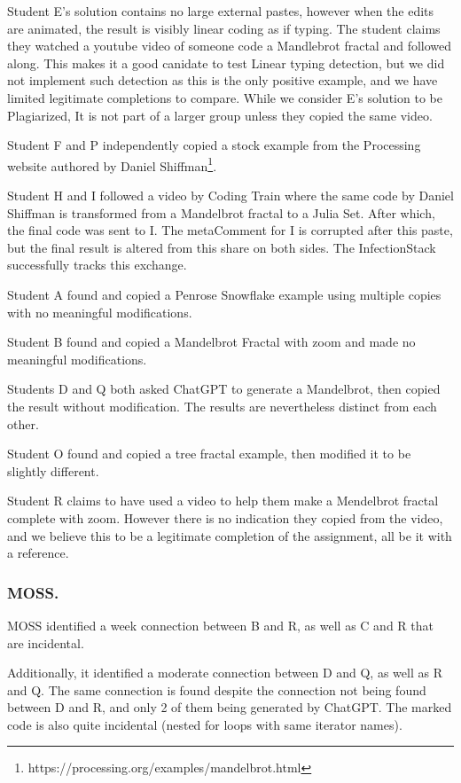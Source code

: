 \documentclass[10pt]{article}
\newcommand{\metaComment}{metaComment\xspace}
\newcommand{\infectionStack}{InfectionStack\xspace}
\begin{document}
Student E's solution contains no large external pastes, however when the edits are animated, the result is visibly linear coding as if typing.  The student claims they watched a youtube video of someone code a Mandlebrot fractal and followed along.  This makes it a good canidate to test Linear typing detection, but we did not implement such detection as this is the only positive example, and we have limited legitimate completions to compare.  While we consider E's solution to be Plagiarized, It is not part of a larger group unless they copied the same video.

Student F and P independently copied a stock example from the Processing website authored by Daniel Shiffman\footnote{https://processing.org/examples/mandelbrot.html}. 

Student H and I followed a video by Coding Train where the same code by Daniel Shiffman is transformed from a Mandelbrot fractal to a Julia Set.  After which, the final code was sent to I.  The \metaComment for I is corrupted after this paste, but the final result is altered from this share on both sides.  The \infectionStack successfully tracks this exchange.

Student A found and copied a Penrose Snowflake example using multiple copies with no meaningful modifications.

Student B found and copied a Mandelbrot Fractal with zoom and made no meaningful modifications.

Students D and Q both asked ChatGPT to generate a Mandelbrot, then copied the result without modification.  The results are nevertheless distinct from each other.

Student O found and copied a tree fractal example, then modified it to be slightly different.

Student R claims to have used a video to help them make a Mendelbrot fractal complete with zoom. However there is no indication they copied from the video, and we believe this to be a legitimate completion of the assignment, all be it with a reference.

\subsubsection{MOSS.\hspace{0.5em}\phantom{}}

MOSS identified a week connection between B and R, as well as C and R that are incidental.  

Additionally, it identified a moderate connection between D and Q, as well as R and Q.  The same connection is found despite the connection not being found between D and R, and only 2 of them being generated by ChatGPT.  The marked code is also quite incidental (nested for loops with same iterator names).
\end{document}
